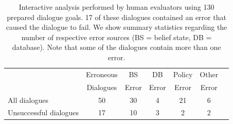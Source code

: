 \documentclass[11pt,a4paper]{article}
\begin{document}
\begin{table}[t]
    \centering\small
    \begin{tabular}{lc|ccccc}
      \toprule
      & Erroneous & BS & DB & Policy & Other \\
      & Dialogues  & Error & Error & Error & Error \\
      \midrule
      All dialogues & 50  & 30 & 4 & 21 & 6 \\
      Unsuccessful dialogues & 17 & 10 & 3 & 2 & 2 \\ 

      \bottomrule
    \end{tabular}
    \caption{Interactive  analysis performed by human evaluators using 130 prepared dialogue goals. 17 of these dialogues contained an error that caused the dialogue to fail. We show summary statistics regarding the number of respective error sources (BS = belief state, DB = database).
    Note that some of the dialogues contain more than one error.}
    \label{tab:interact_eval}
\end{table}

\end{document}
